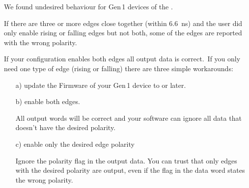 We found undesired behaviour for Gen\,1 devices of the \deviceName.\par
If there are three or more edges close together (within \SI{6.6}{\nano\second}) and the user did only enable rising or falling edges but not both, some of the edges are reported with the wrong polarity. \

If your configuration enables both edges all output data is correct.\
If you only need one type of edge (rising or falling) there are three simple workarounds:\ 

\begin{itemize}
    \item[a)] update the Firmware of your Gen\,1 device to  or later.
    \item[b)] enable both edges.\par
    All output words will be correct and your software can ignore all data that doesn't have the desired polarity.
    \item[c)] enable only the desired edge polarity\par 
    Ignore the polarity flag in the output data. You can trust that only edges with the desired polarity are output, even if the flag in the data word states the wrong polarity.
\end{itemize}